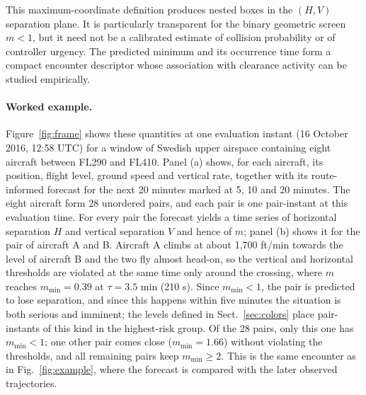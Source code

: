 \documentclass[pdflatex,sn-mathphys-num]{sn-jnl}
\newcommand{\mmin}{m_{\min}}
\begin{document}
This maximum-coordinate definition produces nested boxes in the $(H,V)$ separation plane. It is particularly transparent for the binary geometric screen $m<1$, but it need not be a calibrated estimate of collision probability or of controller urgency. The predicted minimum and its occurrence time form a compact encounter descriptor whose association with clearance activity can be studied empirically.

\paragraph{Worked example.} Figure~\ref{fig:frame} shows these quantities at one evaluation instant (16 October 2016, 12:58 UTC) for a window of Swedish upper airspace containing eight aircraft between FL290 and FL410. Panel (a) shows, for each aircraft, its position, flight level, ground speed and vertical rate, together with its route-informed forecast for the next 20 minutes marked at 5, 10 and 20 minutes. The eight aircraft form 28 unordered pairs, and each pair is one pair-instant at this evaluation time. For every pair the forecast yields a time series of horizontal separation $H$ and vertical separation $V$ and hence of $m$; panel (b) shows it for the pair of aircraft A and B. Aircraft A climbs at about 1,700 ft/min towards the level of aircraft B and the two fly almost head-on, so the vertical and horizontal thresholds are violated at the same time only around the crossing, where $m$ reaches $\mmin=0.39$ at $\tau=3.5$ min (210 s). Since $\mmin<1$, the pair is predicted to lose separation, and since this happens within five minutes the situation is both serious and imminent; the levels defined in Sect.~\ref{sec:colors} place pair-instants of this kind in the highest-risk group. Of the 28 pairs, only this one has $\mmin<1$; one other pair comes close ($\mmin=1.66$) without violating the thresholds, and all remaining pairs keep $\mmin\ge 2$. This is the same encounter as in Fig.~\ref{fig:example}, where the forecast is compared with the later observed trajectories.
\end{document}
